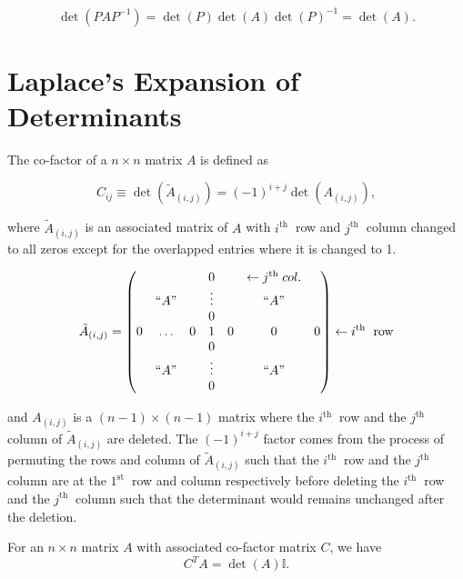 \documentclass[a4paper,12pt]{report}
\begin{document}
\begin{equation}
    \det (PAP^{-1} ) = \det (P)\det (A)\det (P)^{-1} =\det (A).
\end{equation}

\section{Laplace's Expansion of Determinants}


The co-factor of a \(n \times n\) matrix \(A\) is defined as 

\begin{equation}
    C_{ij} \equiv \det (\tilde{A}_{(i,j)}  ) = (-1)^{i+j} \det (A_{(i,j)} ) ,
\end{equation}

where \(\tilde{A}_{(i,j)} \) is an associated matrix of \(A\) with \(i^{\text{th }} \) row and \(j^{\text{th }} \) column changed to all zeros except for the overlapped entries where it is changed to 1.  

\begin{equation}
    \tilde{A}_{(i,j)} = 
\begin{pmatrix}
     &  &  & 0 &  & \leftarrow  j^{\text{th }} col. &   \\
     & ``A\text{''}  &  & \vdots  &  & ``A\text{''}  &   \\
     &  &  & 0 &  &  &   \\
    0 & \ldots  & 0 & 1 & 0 & 0 & 0  \\
     &  &  & 0 &  &  &   \\
     & ``A\text{''}  &  & \vdots  &  & ``A\text{''}  &   \\
     &  &  & 0 &  &  &   \\
\end{pmatrix}
\leftarrow i^{\text{th }}  \text{ row}
\end{equation}

and \(A_{(i,j)} \) is a \((n-1)\times (n-1)\) matrix where the \(i^{\text{th }} \) row and the \(j^{\text{th }} \) column of \(\tilde{A}_{(i,j)}  \)  are deleted. The \((-1)^{i+j} \) factor comes from the process of permuting the rows and column of \(\tilde{A}_{(i,j)}  \) such that the \(i^{\text{th }} \) row and the \(j^{\text{th }} \) column are at the \(1^{\text{st } }\) row and column respectively before deleting the \(i^{\text{th }} \) row and the \(j^{\text{th }} \) column such that the determinant would remains unchanged after the deletion.

\begin{lemma} \label{cofactor} 
For an \(n \times  n\) matrix \(A\) with associated co-factor matrix \(C\), we have 
\begin{equation}
    C^{T} A = \det (A) \mathbb{I}. 
\end{equation}
 
\end{lemma}
\end{document}
